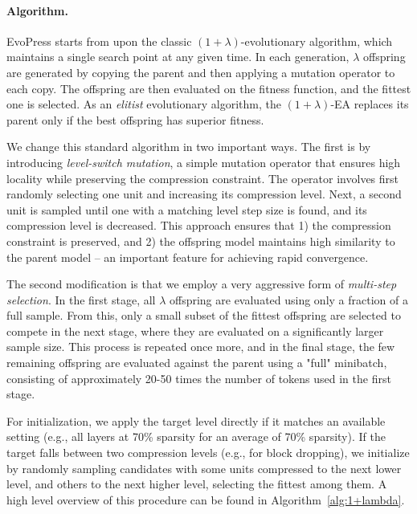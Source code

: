 \documentclass{article}
\theoremstyle{plain}
\theoremstyle{definition}
\theoremstyle{remark}
\newcommand{\olea}{$(1 + \lambda)$-EA\xspace}
\newcommand{\oplea}{\olea}
\newcommand{\methodname}{EvoPress}
\begin{document}


\paragraph{Algorithm.} \methodname{} starts from upon the classic $(1+\lambda)$-evolutionary algorithm, which maintains a single search point at any given time. In each generation, $\lambda$ offspring are generated by copying the parent and then applying a mutation operator to each copy. The offspring are then evaluated on the fitness function, and the fittest one is selected. As an \emph{elitist} evolutionary algorithm, the \oplea replaces its parent only if the best offspring has superior fitness. 

We change this standard algorithm in two important ways. The first is by introducing \emph{level-switch mutation}, a simple mutation operator that ensures high locality while preserving the compression constraint. The operator involves first randomly selecting one unit and increasing its compression level. Next, a second unit is sampled until one with a matching level step size is found, and its compression level is decreased. This approach ensures that 1) the compression constraint is preserved, and 2) the offspring model maintains high similarity to the parent model -- an important feature for achieving rapid convergence. 

The second modification is that we employ a very aggressive form of \emph{multi-step selection}. In the first stage, all $\lambda$ offspring are evaluated using only a fraction of a full sample. From this, only a small subset of the fittest offspring are selected to compete in the next stage, where they are evaluated on a significantly larger sample size. This process is repeated once more, and in the final stage, the few remaining offspring are evaluated against the parent using a "full" minibatch, consisting of approximately 20-50 times the number of tokens used in the first stage. 

For initialization, we apply the target level directly if it matches an available setting (e.g., all layers at 70\% sparsity for an average of 70\% sparsity). If the target falls between two compression levels (e.g., for block dropping), we initialize by randomly sampling candidates with some units compressed to the next lower level, and others to the next higher level, selecting the fittest among them.
A high level overview of this  procedure can be found in Algorithm~\ref{alg:1+lambda}.
\end{document}
